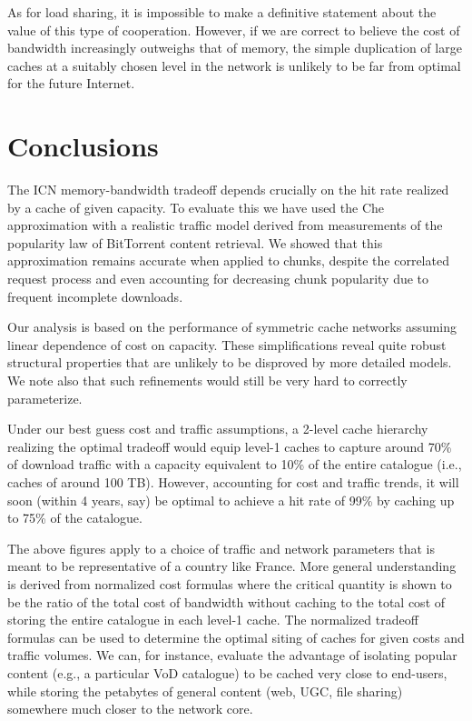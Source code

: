 \documentclass [11pt]{article}
\begin{document}
As for load sharing, it is impossible to make a definitive statement about the value of this type of cooperation. However, if we are correct to believe the cost of bandwidth increasingly outweighs that of memory, the simple duplication of large caches at a suitably chosen level in the network is unlikely to be far from optimal for the future Internet.


\section{Conclusions}
The ICN memory-bandwidth tradeoff depends crucially on the hit rate realized by a cache of given capacity. To evaluate this we have used the Che approximation with a realistic traffic model derived from measurements of the popularity law of BitTorrent content retrieval. We showed that this approximation remains accurate when applied to chunks, despite the correlated request process and even accounting for decreasing chunk popularity due to frequent incomplete downloads.

Our analysis is based on the performance of symmetric cache networks assuming linear dependence of cost on capacity. These simplifications reveal quite robust structural properties that are unlikely to be disproved by more detailed models. We note also that such refinements would still be very hard to correctly parameterize. 

Under our best guess cost and traffic assumptions, a 2-level cache hierarchy realizing the optimal tradeoff would equip level-1 caches to capture around 70\% of download traffic with a capacity equivalent to 10\% of the entire catalogue (i.e., caches of around 100 TB). However, accounting for cost and traffic trends, it will soon (within 4 years, say) be optimal to achieve a hit rate of 99\% by caching up to 75\% of the catalogue. 

The above figures apply to a choice of traffic and network parameters that is meant to be representative of a country like France. More general understanding is derived from normalized cost formulas where the critical quantity is shown to be the ratio of the total cost of bandwidth without caching to the total cost of storing the entire catalogue in each level-1 cache. The normalized tradeoff formulas can be used to determine the optimal siting of caches for given costs and traffic volumes. We can, for instance, evaluate the advantage of isolating popular content (e.g., a particular VoD catalogue) to be cached very close to end-users, while storing the petabytes of general content (web, UGC, file sharing) somewhere much closer to the network core.  
\end{document}
